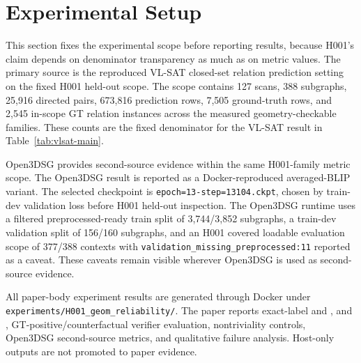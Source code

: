 \section{Experimental Setup}

This section fixes the experimental scope before reporting results, because
H001's claim depends on denominator transparency as much as on metric values.
The primary source is the reproduced VL-SAT closed-set relation prediction
setting on the fixed H001 held-out scope. The scope contains 127 scans, 388
subgraphs, 25,916 directed pairs, 673,816 prediction rows, 7,505 ground-truth
rows, and 2,545 in-scope GT relation instances across the measured
geometry-checkable families. These counts are the fixed denominator for the
VL-SAT result in Table~\ref{tab:vlsat-main}.

Open3DSG provides second-source evidence within the same H001-family metric
scope. The Open3DSG result is reported as a Docker-reproduced averaged-BLIP
variant. The selected checkpoint is \texttt{epoch=13-step=13104.ckpt}, chosen
by train-dev validation loss before H001 held-out inspection. The Open3DSG
runtime uses a filtered preprocessed-ready train split of 3,744/3,852
subgraphs, a train-dev validation split of 156/160 subgraphs, and an H001
covered loadable evaluation scope of 377/388 contexts with
\texttt{validation\_missing\_preprocessed:11} reported as a caveat. These
caveats remain visible wherever Open3DSG is used as second-source evidence.

All paper-body experiment results are generated through Docker under
\texttt{experiments/H001\_geom\_reliability/}. The paper reports exact-label
 and ,  and , GT-positive/counterfactual
verifier evaluation, nontriviality controls, Open3DSG second-source metrics,
and qualitative failure analysis. Host-only outputs are not promoted to paper
evidence.

